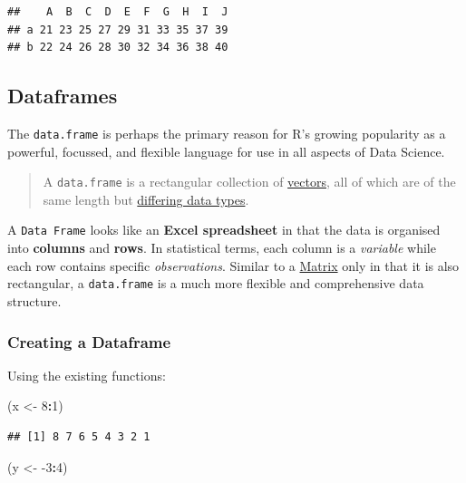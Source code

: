 \documentclass[]{book}
\newenvironment{Shaded}{\begin{snugshade}}{\end{snugshade}}
\newcommand{\DecValTok}[1]{\textcolor[rgb]{0.00,0.00,0.81}{#1}}
\newcommand{\NormalTok}[1]{#1}
\newcommand{\OperatorTok}[1]{\textcolor[rgb]{0.81,0.36,0.00}{\textbf{#1}}}
\newcommand{\StringTok}[1]{\textcolor[rgb]{0.31,0.60,0.02}{#1}}
\theoremstyle{definition}
\theoremstyle{definition}
\theoremstyle{definition}
\theoremstyle{remark}
\begin{document}
\begin{verbatim}
##    A  B  C  D  E  F  G  H  I  J
## a 21 23 25 27 29 31 33 35 37 39
## b 22 24 26 28 30 32 34 36 38 40
\end{verbatim}

\hypertarget{dataframes}{%
\subsection{Dataframes}\label{dataframes}}

The \texttt{data.frame} is perhaps the primary reason for R's growing
popularity as a powerful, focussed, and flexible language for use in all
aspects of Data Science.

\begin{quote}
A \texttt{data.frame} is a rectangular collection of
\protect\hyperlink{vectors}{vectors}, all of which are of the same
length but \protect\hyperlink{data-types}{differing data types}.
\end{quote}

A \texttt{Data\ Frame} looks like an \textbf{Excel spreadsheet} in that
the data is organised into \textbf{columns} and \textbf{rows}. In
statistical terms, each column is a \emph{variable} while each row
contains specific \emph{observations}. Similar to a
\protect\hyperlink{matrices}{Matrix} only in that it is also
rectangular, a \texttt{data.frame} is a much more flexible and
comprehensive data structure.

\hypertarget{creating-a-dataframe}{%
\subsubsection{Creating a Dataframe}\label{creating-a-dataframe}}

Using the existing functions:

\begin{Shaded}
\begin{Highlighting}[]
\NormalTok{(x <-}\StringTok{ }\DecValTok{8}\OperatorTok{:}\DecValTok{1}\NormalTok{)}
\end{Highlighting}
\end{Shaded}

\begin{verbatim}
## [1] 8 7 6 5 4 3 2 1
\end{verbatim}

\begin{Shaded}
\begin{Highlighting}[]
\NormalTok{(y <-}\StringTok{ }\DecValTok{-3}\OperatorTok{:}\DecValTok{4}\NormalTok{)}
\end{Highlighting}
\end{Shaded}
\end{document}
